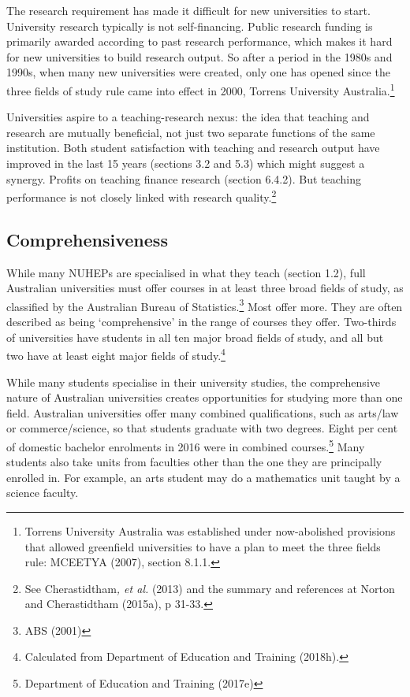 \documentclass[]{book}
\begin{document}
The research requirement has made it difficult for new universities to start. University research typically is not self-financing. Public research funding is primarily awarded according to past research performance, which makes it hard for new universities to build research output. So after a period in the 1980s and 1990s, when many new universities were created, only one has opened since the three fields of study rule came into effect in 2000, Torrens University Australia.\footnote{Torrens University Australia was established under now-abolished provisions that allowed greenfield universities to have a plan to meet the three fields rule: MCEETYA (2007), section 8.1.1.}

Universities aspire to a teaching-research nexus: the idea that teaching and research are mutually beneficial, not just two separate functions of the same institution. Both student satisfaction with teaching and research output have improved in the last 15 years (sections 3.2 and 5.3) which might suggest a synergy. Profits on teaching finance research (section 6.4.2). But teaching performance is not closely linked with research quality.\footnote{See Cherastidtham\emph{, et al.} (2013) and the summary and references at Norton and Cherastidtham (2015a), p 31-33.}

\hypertarget{comprehensiveness}{%
\subsection{Comprehensiveness}\label{comprehensiveness}}

While many NUHEPs are specialised in what they teach (section 1.2), full Australian universities must offer courses in at least three broad fields of study, as classified by the Australian Bureau of Statistics.\footnote{ABS (2001)} Most offer more. They are often described as being `comprehensive' in the range of courses they offer. Two-thirds of universities have students in all ten major broad fields of study, and all but two have at least eight major fields of study.\footnote{Calculated from Department of Education and Training (2018h).}

While many students specialise in their university studies, the comprehensive nature of Australian universities creates opportunities for studying more than one field. Australian universities offer many combined qualifications, such as arts/law or commerce/science, so that students graduate with two degrees. Eight per cent of domestic bachelor enrolments in 2016 were in combined courses.\footnote{Department of Education and Training (2017e)} Many students also take units from faculties other than the one they are principally enrolled in. For example, an arts student may do a mathematics unit taught by a science faculty.
\end{document}
